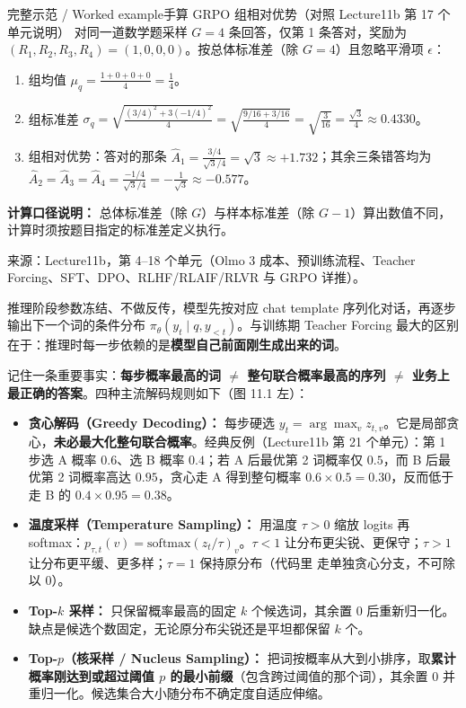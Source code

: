\begin{StudyBlock}{完整示范 / Worked example}{手算 GRPO 组相对优势（对照 Lecture11b 第 17 个单元说明）}
对同一道数学题采样 $G=4$ 条回答，仅第 1 条答对，奖励为 $(R_1,R_2,R_3,R_4)=(1, 0, 0, 0)$。按总体标准差（除 $G=4$）且忽略平滑项 $\epsilon$：
\begin{enumerate}
\item 组均值 $\mu_q = \frac{1+0+0+0}{4} = \frac{1}{4}$。
\item 组标准差 $\sigma_q = \sqrt{\frac{(3/4)^2 + 3(-1/4)^2}{4}} = \sqrt{\frac{9/16 + 3/16}{4}} = \sqrt{\frac{3}{16}} = \frac{\sqrt{3}}{4} \approx 0.4330$。
\item 组相对优势：答对的那条 $\hat{A}_1 = \frac{3/4}{\sqrt{3}/4} = \sqrt{3} \approx +1.732$；其余三条错答均为 $\hat{A}_2=\hat{A}_3=\hat{A}_4 = \frac{-1/4}{\sqrt{3}/4} = -\frac{1}{\sqrt{3}} \approx -0.577$。
\end{enumerate}
\textbf{计算口径说明：} 总体标准差（除 $G$）与样本标准差（除 $G-1$）算出数值不同，计算时须按题目指定的标准差定义执行。
\end{StudyBlock}

来源：Lecture11b，第 4–18 个单元（Olmo 3 成本、预训练流程、Teacher Forcing、SFT、DPO、RLHF/RLAIF/RLVR 与 GRPO 详推）。



推理阶段参数冻结、不做反传，模型先按对应 chat template 序列化对话，再逐步输出下一个词的条件分布 $\pi_\theta(y_t\mid q, y_{<t})$。与训练期 Teacher Forcing 最大的区别在于：推理时每一步依赖的是\textbf{模型自己前面刚生成出来的词}。


记住一条重要事实：\textbf{每步概率最高的词 $\ne$ 整句联合概率最高的序列 $\ne$ 业务上最正确的答案}。四种主流解码规则如下（图 11.1 左）：
\begin{itemize}
\item \textbf{贪心解码（Greedy Decoding）：} 每步硬选 $y_t = \arg\max_v z_{t,v}$。它是局部贪心，\textbf{未必最大化整句联合概率}。经典反例（Lecture11b 第 21 个单元）：第 1 步选 A 概率 $0.6$、选 B 概率 $0.4$；若 A 后最优第 2 词概率仅 $0.5$，而 B 后最优第 2 词概率高达 $0.95$，贪心走 A 得到整句概率 $0.6\times 0.5 = 0.30$，反而低于走 B 的 $0.4\times 0.95 = 0.38$。
\item \textbf{温度采样（Temperature Sampling）：} 用温度 $\tau > 0$ 缩放 logits 再 softmax：$p_{\tau,t}(v)=\mathrm{softmax}(z_t/\tau)_v$。$\tau < 1$ 让分布更尖锐、更保守；$\tau > 1$ 让分布更平缓、更多样；$\tau = 1$ 保持原分布（代码里  走单独贪心分支，不可除以 0）。
\item \textbf{Top-$k$ 采样：} 只保留概率最高的固定 $k$ 个候选词，其余置 0 后重新归一化。缺点是候选个数固定，无论原分布尖锐还是平坦都保留 $k$ 个。
\item \textbf{Top-$p$（核采样 / Nucleus Sampling）：} 把词按概率从大到小排序，取\textbf{累计概率刚达到或超过阈值 $p$ 的最小前缀}（包含跨过阈值的那个词），其余置 0 并重归一化。候选集合大小随分布不确定度自适应伸缩。
\end{itemize}

